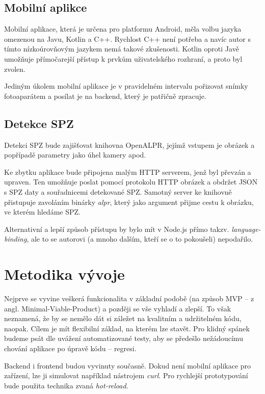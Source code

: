 \subsection{Mobilní aplikce} \label{mobile_app}

\noindent
Mobilní aplikace, která je určena pro platformu Android, měla volbu jazyka omezenou na Javu, Kotlin a C++.
Rychlost C++ není potřeba a navíc autor s tímto nízkoúrovňovým jazykem nemá takové zkušenosti.
Kotlin oproti Javě umožňuje přímočarejší přístup k prvkům uživatelského rozhraní, a proto byl zvolen.

Jediným úkolem mobilní aplikace je v pravidelném intervalu pořizovat snímky fotoaparátem a posílat je na
backend, který je patřičně zpracuje.

\subsection{Detekce SPZ}

\noindent
Detekci SPZ bude zajišťovat knihovna OpenALPR, jejímž vstupem je obrázek a popřípadě
parametry jako úhel kamery apod.
\citep[viz][]{OpenALPR}

Ke zbytku aplikace bude připojena malým HTTP serverem, jenž byl převzán a upraven.
Ten umožňuje poslat pomocí protokolu HTTP obrázek a obdržet JSON s SPZ daty a souřadnicemi detekované SPZ.
Samotný server ke knihovně přistupuje zavoláním binárky \textit{alpr}, který jako argument přijme cestu k
obrázku, ve kterém hledáme SPZ. \citep[viz][]{OpenALPR_Server}

Alternativní a lepší způsob přístupu by bylo mít v Node.js přímo takzv.
\textit{language-binding}, ale to se autorovi (a mnoho dalším, kteří se o to pokoušeli) nepodařilo.

\section{Metodika vývoje}

\noindent
Nejprve se vyvine veškerá funkcionalita v základní podobě
(na způsob MVP -- z angl. Minimal-Viable-Product) a později se vše vyhladí a zlepší. To však neznamená,
že by se nemělo dát si záležet na kvalitním a udržitelném kódu, naopak. Cílem je mít flexibilní základ,
na kterém lze stavět. Pro klidný spánek budeme psát dle uvážení automatizované testy, aby se předešlo
nežádoucímu chování aplikace po úpravě kódu -- regresi.

Backend i frontend budou vyvinuty současně. Dokud není mobilní aplikace pro zařízení, lze ji simulovat
například nástrojem \textit{curl}. Pro rychlejší prototypování bude použita technika zvaná
\textit{hot-reload}.
